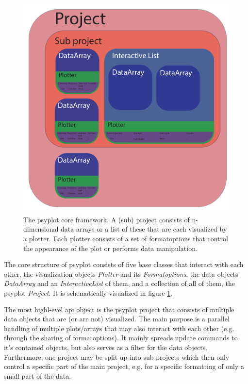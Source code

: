 \begin{refsection}
\begin{figure}
	\includegraphics[width=\linewidth]{psyplot-figures/psyplot_framework.pdf}
	\caption[The psyplot core framework]{The psyplot core framework. A (sub) project consists of n-dimensional data arrays or a list of these that are each visualized by a plotter. Each plotter consists of a set of formatoptions that control the appearance of the plot or performs data manipulation.}
	\label{fig:psyplot-core}
\end{figure}

The core structure of psyplot consists of five base classes that interact with each other, the visualization objects \textit{Plotter} and its \textit{Formatoptions}, the data objects \textit{DataArray} and an \textit{InteractiveList} of them, and a collection of all of them, the psyplot \textit{Project}. It is schematically visualized in figure \ref{fig:psyplot-core}.

The most highl-evel \gls{api} object is the psyplot project that consists of multiple data objects that are (or are not) visualized. The main purpose is a parallel handling of multiple plots/arrays that may also interact with each other (e.g. through the sharing of formatoptions). It mainly spreads update commands to it's contained objects, but also serves as a filter for the data objects. Furthermore, one project may be split up into sub projects which then only control a specific part of the main project, e.g. for a specific formatting of only a small part of the data.


\end{refsection}
